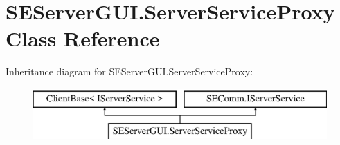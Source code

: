 \hypertarget{class_s_e_server_g_u_i_1_1_server_service_proxy}{}\section{S\+E\+Server\+G\+U\+I.\+Server\+Service\+Proxy Class Reference}
\label{class_s_e_server_g_u_i_1_1_server_service_proxy}
Inheritance diagram for S\+E\+Server\+G\+U\+I.\+Server\+Service\+Proxy\+:\begin{figure}[H]
\begin{center}
\leavevmode
\includegraphics[height=2.000000cm]{class_s_e_server_g_u_i_1_1_server_service_proxy}
\end{center}
\end{figure}
